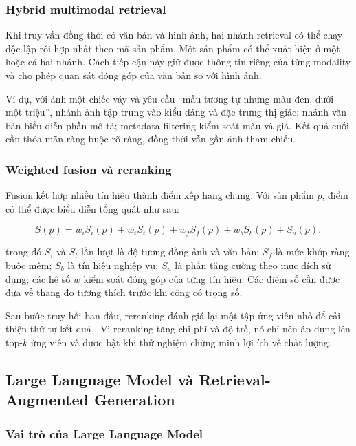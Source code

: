 \subsubsection{Hybrid multimodal retrieval}

Khi truy vấn đồng thời có văn bản và hình ảnh, hai nhánh retrieval có thể chạy độc lập rồi hợp nhất theo mã sản phẩm. Một sản phẩm có thể xuất hiện ở một hoặc cả hai nhánh. Cách tiếp cận này giữ được thông tin riêng của từng modality và cho phép quan sát đóng góp của văn bản so với hình ảnh.

Ví dụ, với ảnh một chiếc váy và yêu cầu “mẫu tương tự nhưng màu đen, dưới một triệu”, nhánh ảnh tập trung vào kiểu dáng và đặc trưng thị giác; nhánh văn bản biểu diễn phần mô tả; metadata filtering kiểm soát màu và giá. Kết quả cuối cần thỏa mãn ràng buộc rõ ràng, đồng thời vẫn gần ảnh tham chiếu.

\subsubsection{Weighted fusion và reranking}

Fusion kết hợp nhiều tín hiệu thành điểm xếp hạng chung. Với sản phẩm $p$, điểm có thể được biểu diễn tổng quát như sau:

\begin{equation}
    S(p)=w_iS_i(p)+w_tS_t(p)+w_fS_f(p)+w_bS_b(p)+S_u(p),
    \label{eq:multimodal_fusion}
\end{equation}

trong đó $S_i$ và $S_t$ lần lượt là độ tương đồng ảnh và văn bản; $S_f$ là mức khớp ràng buộc mềm; $S_b$ là tín hiệu nghiệp vụ; $S_u$ là phần tăng cường theo mục đích sử dụng; các hệ số $w$ kiểm soát đóng góp của từng tín hiệu. Các điểm số cần được đưa về thang đo tương thích trước khi cộng có trọng số.

Sau bước truy hồi ban đầu, reranking đánh giá lại một tập ứng viên nhỏ để cải thiện thứ tự kết quả \parencite{reranking_sbert}. Vì reranking tăng chi phí và độ trễ, nó chỉ nên áp dụng lên top-$k$ ứng viên và được bật khi thử nghiệm chứng minh lợi ích về chất lượng.

\subsection{Large Language Model và Retrieval-Augmented Generation}

\subsubsection{Vai trò của Large Language Model}

